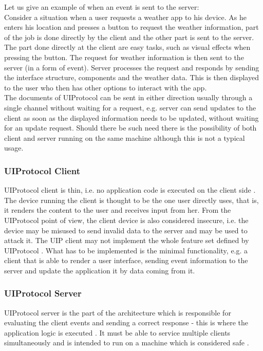Let us give an example of when an event is sent to the server:\\
Consider a situation when a user requests a weather app to his device. As he enters his location and presses a button to request the weather information, part of the job is done directly by the client and the other part is sent to the server. The part done directly at the client are easy tasks, such as visual effects when pressing the button. The request for weather information is then sent to the server (in a form of event). Server processes the request and responds by sending the interface structure, components and the weather data. This is then displayed to the user who then has other options to interact with the app.\\
The documents of UIProtocol can be sent in either direction usually through a single channel without waiting for a request, e.g. server can send updates to the client as soon as the displayed information needs to be updated, without waiting for an update request. Should there be such need there is the possibility of both client and server running on the same machine although this is not a typical usage.

\subsubsection{UIProtocol Client}
UIProtocol client is thin, i.e. no application code is executed on the client side \cite{uip}. The device running the client is thought to be the one user directly uses, that is, it renders the content to the user and receives input from her. From the UIProtocol point of view, the client device is also considered insecure, i.e. the device may be misused to send invalid data to the server and may be used to attack it. The UIP client may not implement the whole feature set defined by UIProtocol \cite{uip}. What has to be implemented is the minimal functionality, e.g. a client that is able to render a user interface, sending event information to the server and update the application it by data coming from it.

\subsubsection{UIProtocol Server}
UIProtocol server is the part of the architecture which is responsible for evaluating the client events and sending a correct response - this is where the application logic is executed \cite{uip}. It must be able to service multiple clients simultaneously and is intended to run on a machine which is considered safe \cite{uip}.

